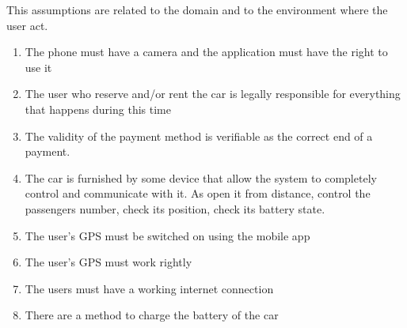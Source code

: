 This assumptions are related to the domain and to the environment where the user act.
\begin{enumerate}[label=\subscript{A}{\arabic *}]
 	\item The phone must have a camera and the application must have the right to use it
	\item The user who reserve and/or rent the car is legally responsible for everything that happens during this time
	\item The validity of the payment method is verifiable as the correct end of a payment.
	\item  The car is furnished by some device that allow the system to completely control and communicate with it. As open it from distance, control the passengers number, check its position, check its battery state. 
	\item The user's GPS must be switched on using the mobile app
	\item The user's GPS must work rightly
	\item The users must have a working internet connection
	\item There are a method to charge the battery of the car
\end{enumerate}
